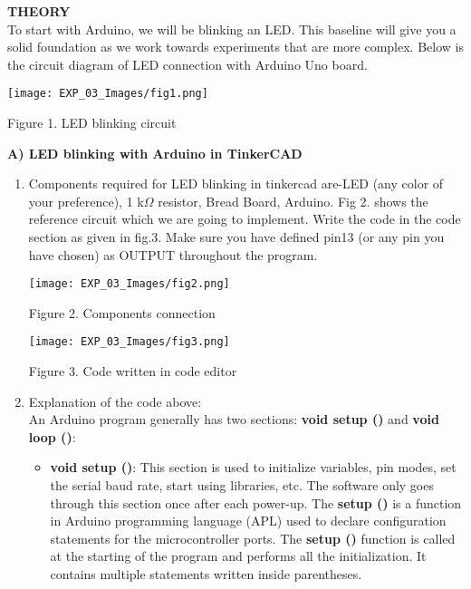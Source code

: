\documentclass[12pt,a4paper]{article}
\begin{document}
\begin{justify}
\textbf{\large THEORY}\\[3pt]
To start with Arduino, we will be blinking an LED. This baseline will give you a solid foundation as we work towards experiments that are more complex.  Below is the circuit diagram of LED connection with Arduino Uno board.

    \begin{center} 
    \texttt{[image: EXP\_03\_Images/fig1.png]}
    \end{center}
    \begin{center} {Figure 1. LED blinking circuit}\end{center}
\noindent \textbf{A) LED blinking with Arduino in TinkerCAD}\\
\vspace{-8mm}
\begin{enumerate}
    \item Components required for LED blinking in tinkercad are-LED (any color of your preference), 1 k$\Omega$ resistor, Bread Board, Arduino. Fig 2. shows the reference circuit which we are going to implement. Write the code in the code section as given in fig.3. Make sure you have defined pin13 (or any pin you have chosen) as OUTPUT throughout the program.
    
    \begin{center} 
    \texttt{[image: EXP\_03\_Images/fig2.png]}
    \end{center}
    \begin{center} {Figure 2. Components connection}\end{center}
    
    \begin{center} 
    \texttt{[image: EXP\_03\_Images/fig3.png]}
    \end{center}
    \begin{center} {Figure 3. Code written in code editor }\end{center}
    
\vspace{2cm}
 \item Explanation of the code above: \\[3pt]
 An Arduino program generally has two sections: \textbf{void setup ()} and \textbf{void loop ()}:
    \begin{itemize}
      \item \textbf{void setup ()}: This section is used to initialize variables, pin modes, set the serial baud rate, start using libraries, etc. The software only goes through this section once after each power-up. The \textbf{setup ()} is a function in Arduino programming language (APL) used to declare configuration statements for the microcontroller ports. The \textbf{setup ()} function is called at the starting of the program and performs all the initialization. It contains multiple statements written inside parentheses.
      

\end{itemize}
\end{enumerate}
\end{justify}
\end{document}
